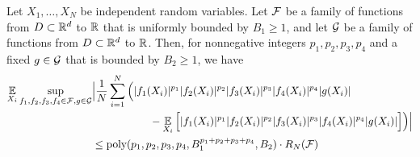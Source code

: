 \begin{lemma} \label{lemma:symmetrization}
Let $X_1, \ldots, X_N$ be independent random variables. Let $\mathcal{F}$ be a family of functions from $D \subset \mathbb{R}^d$ to $\mathbb{R}$ that is uniformly bounded by $B_1 \geq 1$, and let $\mathcal{G}$ be a family of functions from $D \subset \mathbb{R}^d$ to $\mathbb{R}$. Then, for nonnegative integers $p_1, p_2, p_3, p_4$ and a fixed $g \in \mathcal{G}$ that is bounded by $B_2 \geq 1$, we have
\begin{align}
\operatorname*{\mathbb{E}}_{X_i} \sup_{f_1, f_2, f_3, f_4 \in \mathcal{F}, g \in \mathcal{G}} & \Big| \frac{1}{N} \sum_{i = 1}^N \Big(|f_1(X_i)|^{p_1} |f_2(X_i)|^{p_2} |f_3(X_i)|^{p_3} |f_4(X_i)|^{p_4} |g(X_i)| \\
& \,\,\,\,\,\,\,\,\,\,\,\,\,\,\,\,\,\,\,\,\,\,\,\,\,\,\,\,\,\,\,\, - \operatorname*{\mathbb{E}}_{X_i} \Big[ |f_1(X_i)|^{p_1} |f_2(X_i)|^{p_2} |f_3(X_i)|^{p_3} |f_4(X_i)|^{p_4} |g(X_i)| \Big] \Big) \Big| \\
& \leq \textup{poly}(p_1, p_2, p_3, p_4, B_1^{p_1 + p_2 + p_3 + p_4}, B_2) \cdot {R_N}(\mathcal{F})
\end{align}
\end{lemma}
